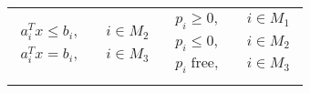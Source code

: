 \documentclass{article}
\begin{document}
\begin{preview}
\begin{center}
\begin{tabular}{l l}
\begin{math}
\begin{aligned}
                                                a^{T}_{i}x \leq{b_i}, \quad & i \in M_2 \\
                                                a^{T}_{i}x = b_i, \quad & i \in M_3
                                        \end{aligned}
                                \end{math} &
                                        \begin{math}
                                                \begin{aligned}
                                                        p_i \geq{0}, \quad & i \in M_1 \\
                                                        p_i \leq{0}, \quad & i \in M_2 \\
                                                        p_i \; \text{free}, \quad & i \in M_3
                                                \end{aligned}
                                        \end{math} \\
                                \multicolumn{1}{c}{} \\
                        \end{tabular}


\end{center}
\end{preview}
\end{document}
